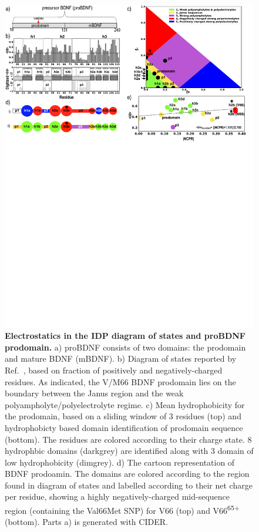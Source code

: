 \documentclass[journal=jacsat,manuscript=article]{achemso}
\begin{document}
\begin{figure}[!ht]
 \includegraphics[scale=0.5,width=\textwidth,trim={0 0cm 0 0cm},clip]{../figures/fig1.pdf}
\caption{{\bf Electrostatics in the IDP diagram of states and proBDNF prodomain.} 
a) proBDNF consists of two domains: the prodomain and mature BDNF (mBDNF). b) Diagram of states reported by Ref.~\cite {Das2015,Das2013a}, based on fraction of positively and negatively-charged residues.  As indicated, the V/M66 BDNF prodomain lies on the boundary between the Janus region and the weak polyampholyte/polyelectrolyte regime. 
c) Mean hydrophobicity for the prodomain, based on a sliding window of 3 residues (top) and hydrophobicty based domain identification of prodomain sequence (bottom). The residues are colored according to their charge state. 8 hydrophbic domains (darkgrey) are identified along with 3 domain of low hydrophobicity (dimgrey). d) The cartoon representation of BDNF prodoamin. The domains are colored according to the region found in diagram of states and labelled according to their net charge per residue, showing a highly negatively-charged mid-sequence region (containing the Val66Met SNP)  for V66 (top) and V66\textsuperscript{65+} (bottom). Parts a) is generated with CIDER. ~\cite {Holehouse2017} }
\label{fig1} 
\end{figure}
\end{document}
